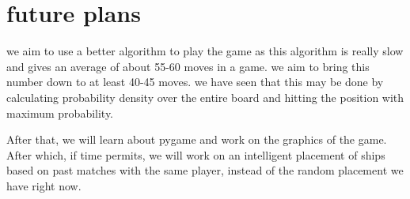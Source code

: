 \documentclass{article}
\begin{document}
   \section{future plans}
   we aim to use a better algorithm to play the game as this algorithm is really slow and gives an average of about 55-60 moves in a game. we aim to bring this number down to at least 40-45 moves. we have seen that this may be done by calculating probability density over the entire board and hitting the position with maximum probability.
   
   After that, we will learn about pygame and work on the graphics of the game. After which, if time permits, we will work on an intelligent placement of ships based on past matches with the same player, instead of the random placement we have right now.
\end{document}
